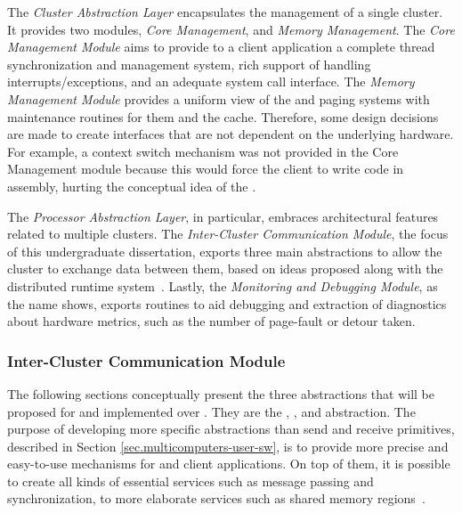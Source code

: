 
	        The \textit{Cluster Abstraction Layer} encapsulates the management of a single cluster.
	        It provides two modules, \textit{Core Management}, and \textit{Memory Management}.
	        The \textit{Core Management Module} aims to provide to a client application a complete
	        thread synchronization and management system, rich support of handling
	        interrupts/exceptions, and an adequate system call interface.
	        The \textit{Memory Management Module} provides a uniform view of the \tlbs
	        and paging systems with maintenance routines for them and the cache.
	        Therefore, some design decisions are made to create interfaces that are not
	        dependent on the underlying hardware.
	        For example, a context switch mechanism was not provided in the
	        Core Management module because this would force the client \os
	        to write code in assembly, hurting the conceptual idea of the \hal.

	        The \textit{Processor Abstraction Layer}, in particular, embraces
	        architectural features related to multiple clusters.
	        The \textit{Inter-Cluster Communication Module}, the focus of
	        this undergraduate dissertation, exports three main abstractions to allow the
	        cluster to exchange data between them, based on ideas proposed along with the
	        \nodeos distributed runtime system~\cite{DeDinechin2013-1}.
	        Lastly, the \textit{Monitoring and Debugging Module}, as the
	        name shows, exports routines to aid debugging and extraction
	        of diagnostics about hardware metrics, such as the number of
	        page-fault or detour taken.

	        \subsubsection{Inter-Cluster Communication Module}
		\label{sec.inter-cluster-communication}

			The following sections conceptually present the three abstractions
			that will be proposed for \hal and implemented over \mppa.
		        	They are the \sync, \mailbox, and \portal abstraction.
		        	The purpose of developing more specific abstractions than
	        		send and receive primitives, described in Section \ref{sec.multicomputers-user-sw},
		        	is to provide more precise and easy-to-use mechanisms for
	        		\os and client applications.
        			On top of them, it is possible to create all kinds of essential
		        	services such as message passing and synchronization,
        			to more elaborate services such as shared memory regions~\cite{penna:rmen}.
        
